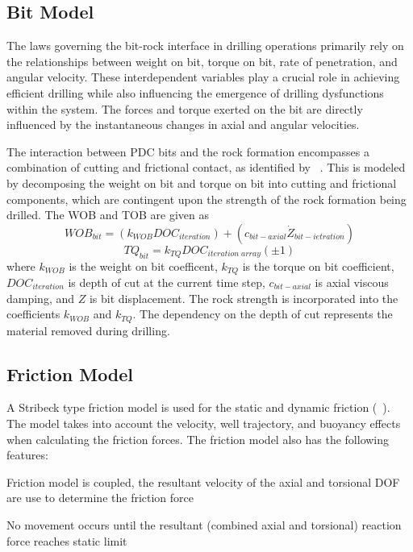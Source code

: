 \subsection{Bit Model}
\label{sec:exxonbitmodel}
The laws governing the bit-rock interface in drilling operations primarily rely on the relationships between weight on bit, torque on bit, rate of penetration, and angular velocity. These interdependent variables play a crucial role in achieving efficient drilling while also influencing the emergence of drilling dysfunctions within the system. The forces and torque exerted on the bit are directly influenced by the instantaneous changes in axial and angular velocities.

The interaction between PDC bits and the rock formation encompasses a combination of cutting and frictional contact, as identified by ~\cite{ref:detournay1992a}.   This is modeled by decomposing the weight on bit and torque on bit into cutting and frictional components, which are contingent upon the strength of the rock formation being drilled.  The WOB and TOB are given as
\begin{equation}\label{WOB}
  WOB_{bit} = (k_{WOB} DOC_{iteration}) + (c_{bit-axial} \dot{Z}_{bit-ietration})
\end{equation}
\begin{equation}\label{Torque}
  TQ_{bit} = k_{TQ} DOC_{iteration\; array} (\pm1)
\end{equation}
where $k_{WOB}$ is the weight on bit coefficent, $k_{TQ}$ is the torque on bit coefficient, $DOC_{iteration}$ is depth of cut at the current time step, $c_{bit-axial}$ is axial viscous damping, and $Z$ is bit displacement.  The rock strength is incorporated into the coefficients $k_{WOB}$ and $k_{TQ}$.  The dependency on the depth of cut represents the material removed during drilling.

\subsection{Friction Model}
\label{sec:exxonfrictionmodel}
A Stribeck type friction model is used for the static and dynamic friction (~\cite{ref:cayeux2020a}).  The model takes into account the velocity, well trajectory, and buoyancy effects when calculating the friction forces. The friction model also has the following features:
\begin{bulletedlist}
    \item Friction model is coupled, the resultant velocity of the axial and torsional DOF are use to determine the friction force
    \item No movement occurs until the resultant (combined axial and torsional) reaction force reaches static limit
\end{bulletedlist}

